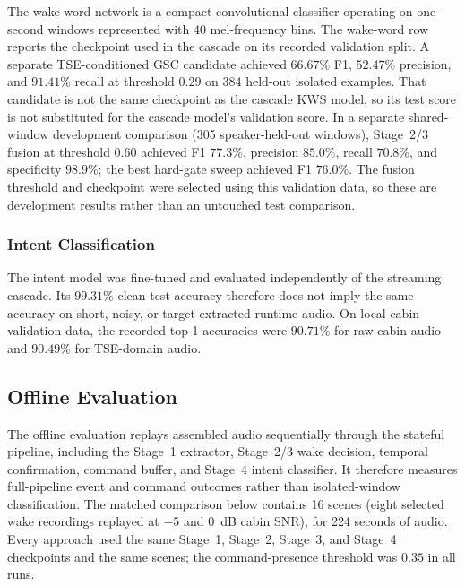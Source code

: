 The wake-word network is a compact convolutional classifier operating on one-second windows represented with 40 mel-frequency bins. The wake-word row reports the checkpoint used in the cascade on its recorded validation split. A separate TSE-conditioned GSC candidate achieved $66.67\%$ F1, $52.47\%$ precision, and $91.41\%$ recall at threshold $0.29$ on 384 held-out isolated examples. That candidate is not the same checkpoint as the cascade KWS model, so its test score is not substituted for the cascade model's validation score. In a separate shared-window development comparison (305 speaker-held-out windows), Stage~2/3 fusion at threshold $0.60$ achieved F1 $77.3\%$, precision $85.0\%$, recall $70.8\%$, and specificity $98.9\%$; the best hard-gate sweep achieved F1 $76.0\%$. The fusion threshold and checkpoint were selected using this validation data, so these are development results rather than an untouched test comparison.

\subsubsection{Intent Classification}

The intent model was fine-tuned and evaluated independently of the streaming cascade. Its $99.31\%$ clean-test accuracy therefore does not imply the same accuracy on short, noisy, or target-extracted runtime audio. On local cabin validation data, the recorded top-1 accuracies were $90.71\%$ for raw cabin audio and $90.49\%$ for TSE-domain audio.

\subsection{Offline Evaluation}

The offline evaluation replays assembled audio sequentially through the stateful pipeline, including the Stage~1 extractor, Stage~2/3 wake decision, temporal confirmation, command buffer, and Stage~4 intent classifier. It therefore measures full-pipeline event and command outcomes rather than isolated-window classification. The matched comparison below contains 16 scenes (eight selected wake recordings replayed at $-5$ and $0$~dB cabin SNR), for 224 seconds of audio. Every approach used the same Stage~1, Stage~2, Stage~3, and Stage~4 checkpoints and the same scenes; the command-presence threshold was $0.35$ in all runs.

